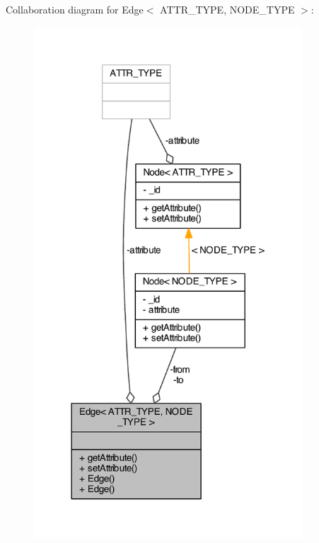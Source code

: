 Collaboration diagram for Edge$<$ A\+T\+T\+R\+\_\+\+T\+Y\+P\+E, N\+O\+D\+E\+\_\+\+T\+Y\+P\+E $>$\+:\nopagebreak
\begin{figure}[H]
\begin{center}
\leavevmode
\includegraphics[width=285pt]{class_edge__coll__graph}
\end{center}
\end{figure}
